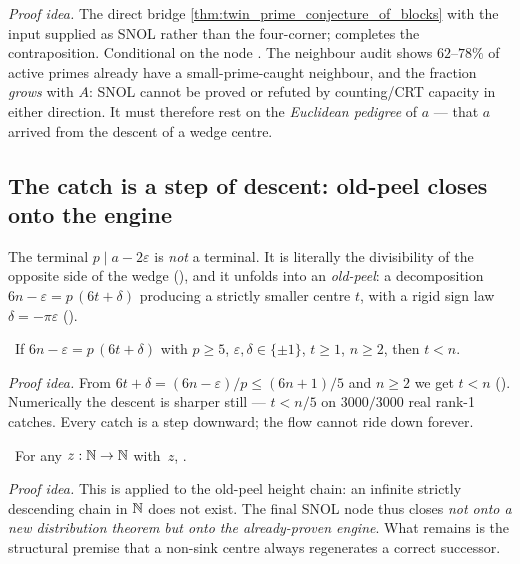 \emph{Proof idea.} The direct bridge \cref{thm:twin_prime_conjecture_of_blocks} with the input
supplied as SNOL rather than the four-corner;  completes the
contraposition. Conditional on the \red{} node . The neighbour audit shows
$62$--$78\%$ of active primes already have a small-prime-caught neighbour, and the fraction
\emph{grows} with $A$: SNOL cannot be proved or refuted by counting/CRT capacity in either direction.
It must therefore rest on the \emph{Euclidean pedigree} of $a$ --- that $a$ arrived from the descent
of a wedge centre.

\subsection{The catch is a step of descent: old-peel closes onto the engine}

The terminal $p\mid a-2\varepsilon$ is \emph{not} a terminal. It is literally the divisibility of the
opposite side of the wedge (), and it unfolds into an \emph{old-peel}: a
decomposition $6n-\varepsilon=p\,(6t+\delta)$ producing a strictly smaller centre $t$, with a rigid
sign law $\delta=-\pi\varepsilon$ ().

\begin{theorem}\label{thm:old_peel_height_drop}
\green{}\ If $6n-\varepsilon=p\,(6t+\delta)$ with $p\ge5$, $\varepsilon,\delta\in\{\pm1\}$, $t\ge1$,
$n\ge2$, then $t<n$. 
\end{theorem}

\emph{Proof idea.} From $6t+\delta=(6n-\varepsilon)/p\le(6n+1)/5$ and $n\ge2$ we get $t<n$
(). Numerically the descent is sharper still --- $t<n/5$ on $3000/3000$ real
rank-1 catches. Every catch is a step downward; the flow cannot ride down forever.

\begin{theorem}\label{thm:no_infinite_old_peel}
\green{}\ For any $z:\mathbb{N}\to\mathbb{N}$ with \,$z$, .
\end{theorem}

\emph{Proof idea.} This is  applied to the old-peel height chain:
an infinite strictly descending chain in $\mathbb{N}$ does not exist. The final SNOL node thus closes
\emph{not onto a new distribution theorem but onto the already-proven engine}. What remains is the
structural premise that a non-sink centre always regenerates a correct successor.

